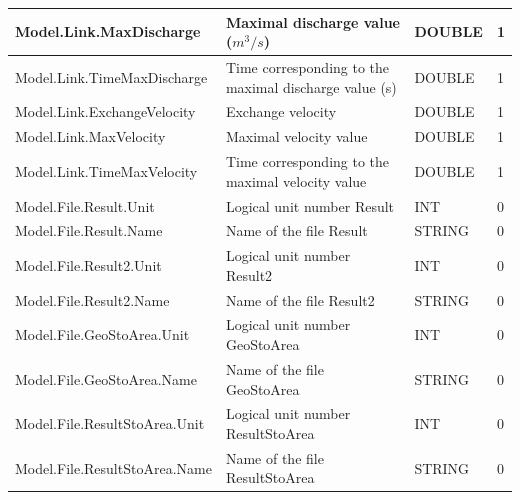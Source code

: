 \documentclass[a4paper,11pt]{article}
\begin{document}
\begin{landscape}
\begin{table}[ht]
\begin{center}
\begin{tabular}{|l|l|l|l|}
\hline  Model.Link.MaxDischarge & Maximal discharge value ($m^3/s$) & DOUBLE & 1 \\
\hline  Model.Link.TimeMaxDischarge & Time corresponding to the maximal discharge value (s) & DOUBLE & 1 \\
\hline  Model.Link.ExchangeVelocity & Exchange velocity & DOUBLE & 1 \\
\hline  Model.Link.MaxVelocity & Maximal velocity value & DOUBLE & 1 \\
\hline  Model.Link.TimeMaxVelocity & Time corresponding to the maximal velocity value & DOUBLE & 1 \\
\hline  Model.File.Result.Unit & Logical unit number Result & INT & 0 \\
\hline  Model.File.Result.Name & Name of the file Result & STRING & 0 \\
\hline  Model.File.Result2.Unit & Logical unit number Result2 & INT & 0 \\
\hline  Model.File.Result2.Name & Name of the file Result2 & STRING & 0 \\
\hline  Model.File.GeoStoArea.Unit & Logical unit number GeoStoArea & INT & 0 \\
\hline  Model.File.GeoStoArea.Name & Name of the file GeoStoArea & STRING & 0 \\
\hline  Model.File.ResultStoArea.Unit & Logical unit number ResultStoArea & INT & 0 \\
\hline  Model.File.ResultStoArea.Name & Name of the file ResultStoArea & STRING & 0 \\
\hline

\end{tabular} 
\end{center}
\end{table}
\begin{table}[ht]
\begin{center}
\begin{tabular}{|l|l|l|l|}


\end{tabular}
\end{center}
\end{table}
\end{landscape}
\end{document}

